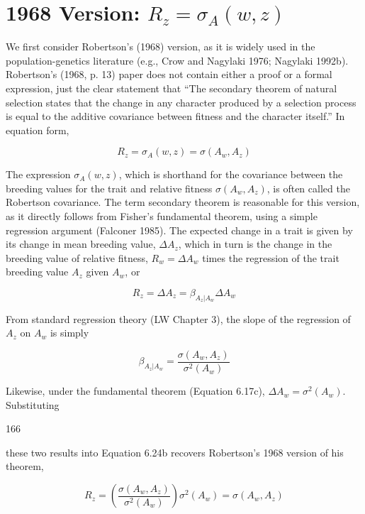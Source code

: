 \documentclass{article}
\begin{document}
\section{1968 Version:  $ R_{z} = \sigma_{A}(w, z) $}
We first consider Robertson’s (1968) version, as it is widely used in the population-genetics literature (e.g., Crow and Nagylaki 1976; Nagylaki 1992b). Robertson’s (1968, p. 13) paper does not contain either a proof or a formal expression, just the clear statement that “The secondary theorem of natural selection states that the change in any character produced by a selection process is equal to the additive covariance between fitness and the character itself.” In equation form,

\begin{equation}
R_{z}=\sigma_{A}(w,z)=\sigma(A_{w},A_{z})
\tag{6.24a}
\label{eq:6_24a}
\end{equation}

The expression  $ \sigma_A(w, z) $, which is shorthand for the covariance between the breeding values for the trait and relative fitness  $ \sigma(A_w, A_z) $, is often called the Robertson covariance. The term secondary theorem is reasonable for this version, as it directly follows from Fisher's fundamental theorem, using a simple regression argument (Falconer 1985). The expected change in a trait is given by its change in mean breeding value,  $ \Delta A_z $, which in turn is the change in the breeding value of relative fitness,  $ R_w = \Delta A_w $ times the regression of the trait breeding value  $ A_z $ given  $ A_w $, or

\begin{equation}
R_{z}=\Delta A_{z}=\beta_{A_{z}|A_{w}}\Delta A_{w}
\tag{6.24b}
\label{eq:6_24b}
\end{equation}

From standard regression theory (LW Chapter 3), the slope of the regression of  $ A_{z} $ on  $ A_{w} $ is simply

\begin{equation}
\beta_{A_{z}|A_{w}}=\frac{\sigma(A_{w},A_{z})}{\sigma^{2}(A_{w})}
\tag{6.24c}
\label{eq:6_24c}
\end{equation}

Likewise, under the fundamental theorem (Equation 6.17c),  $ \Delta A_w = \sigma^2(A_w) $. Substituting

166

these two results into Equation 6.24b recovers Robertson’s 1968 version of his theorem,

\begin{equation}
R_{z}=\left(\frac{\sigma(A_{w},A_{z})}{\sigma^{2}(A_{w})}\right)\sigma^{2}(A_{w})=\sigma(A_{w},A_{z})
\end{equation}
\end{document}
